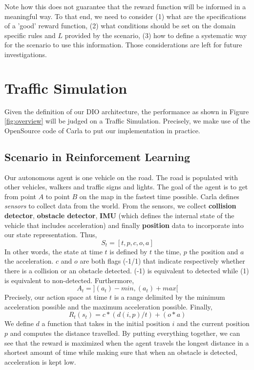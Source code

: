 \documentclass[a4paper,11pt]{article}
\theoremstyle{definition}
\begin{document}
Note how this does not guarantee that the reward function will be informed in a meaningful way.
To that end, we need to consider (1) what are the specifications of a 'good' reward function, (2) what conditions should be set 
on the domain specific rules and $L$ provided by the scenario, (3) how to define a systematic way for the scenario to use 
this information. Those considerations are left for future investigations. 

 

\section{Traffic Simulation} \label{traffic}
Given the definition of our DIO architecture, the performance as shown in Figure \ref{fig:overview} will be judged on a Traffic Simulation. 
Precisely, we make use of the OpenSource code of Carla \cite{Dosovitskiy17} to put our implementation in practice. 
\subsection{Scenario in Reinforcement Learning}
Our autonomous agent is one vehicle on the road. The road is populated with other vehicles, walkers and traffic signs and lights. 
The goal of the agent is to get from point $A$ to point $B$ on the map in the fastest time possible. Carla defines \emph{sensors} to collect 
data from the world. From the sensors, we collect \textbf{collision detector}, \textbf{obstacle detector}, \textbf{IMU} (which defines the internal state of the vehicle that includes acceleration)
and finally \textbf{position} data to incorporate into our state representation. Thus, 
\begin{equation*}
  S_t = [t, p, c, o, a]
\end{equation*} 
In other words, the state at time $t$ is defined by $t$ the time, $p$ the position and $a$ the acceleration. $c$ and $o$ are both flags (-1/1) that indicate 
respectively whether there is a collision or an obstacle detected. (-1) is equivalent to detected while (1) is equivalent to non-detected. Furthermore, 
\begin{equation*}
  A_t = ](a_t)-min, (a_t)+max[
\end{equation*}
Precisely, our action space at time $t$ is a range delimited by the minimum acceleration possible and the maximum acceleration possible. Finally, 
\begin{equation*}
  R_t(s_t) = c * (d(i, p)/t) + (o * a)
\end{equation*}
We define $d$ a function that takes in the initial position $i$ and the current position $p$ and computes the distance travelled. 
By putting everything together, we can see that the reward is maximized when the agent travels the longest distance in a shortest 
amount of time while making sure that when an obstacle is detected, acceleration is kept low. 
\end{document}
